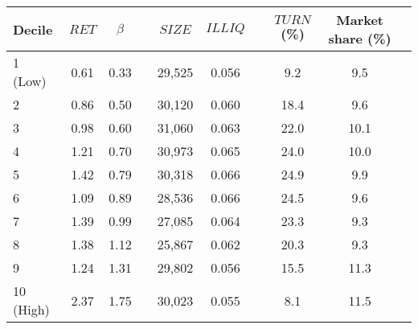 \begin{tabular}{@{}lccccccccc@{}}
	\toprule
	Decile & $\textit{RET}$ & $\beta$ && $\textit{SIZE}$ & $\textit{ILLIQ}$ && $\textit{TURN}$ (\%) & Market share (\%) \\ \midrule
1 (Low) & 0.61 & 0.33 && 29,525 & 0.056 && 9.2 & 9.5 \\
2       & 0.86 & 0.50 && 30,120 & 0.060 && 18.4 & 9.6 \\
3       & 0.98 & 0.60 && 31,060 & 0.063 && 22.0 & 10.1 \\
4       & 1.21 & 0.70 && 30,973 & 0.065 && 24.0 & 10.0 \\
5       & 1.42 & 0.79 && 30,318 & 0.066 && 24.9 & 9.9 \\
6       & 1.09 & 0.89 && 28,536 & 0.066 && 24.5 & 9.6 \\
7       & 1.39 & 0.99 && 27,085 & 0.064 && 23.3 & 9.3 \\
8       & 1.38 & 1.12 && 25,867 & 0.062 && 20.3 & 9.3 \\
9       & 1.24 & 1.31 && 29,802 & 0.056 && 15.5 & 11.3 \\
10 (High) & 2.37 & 1.75 && 30,023 & 0.055 && 8.1 & 11.5 \\
	\bottomrule
\end{tabular}